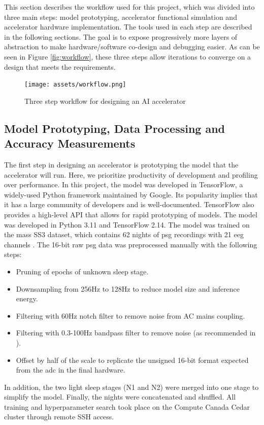 This section describes the workflow used for this project, which was divided into three main steps: model prototyping, accelerator functional simulation and accelerator hardware implementation.
The tools used in each step are described in the following sections. The goal is to expose progressively more layers of abstraction to make hardware/software co-design and debugging easier. As
can be seen in Figure \ref{fig:workflow}, these three steps allow iterations to converge on a design that meets the requirements.
\begin{figure}[H]
    \centering
    \caption{Three step workflow for designing an AI accelerator}
    \texttt{[image: assets/workflow.png]}
\end{figure}
\label{fig:workflow}

\subsection{Model Prototyping, Data Processing and Accuracy Measurements}
The first step in designing an accelerator is prototyping the model that the accelerator will run. Here, we prioritize productivity of development and profiling over performance. In this project,
the model was developed in TensorFlow, a widely-used Python framework maintained by Google. Its popularity implies that it has a large community of developers and is well-documented. TensorFlow
also provides a high-level API that allows for rapid prototyping of models.
The model was developed in Python 3.11 and TensorFlow 2.14. The model was trained on the \ac{mass} SS3 dataset, which contains 62 nights of \ac{psg} recordings with 21 \ac{eeg} channels \cite*{SP3/9MYUCS_2022}.
The 16-bit raw \ac{psg} data was preprocessed manually with the following steps:
\begin{itemize}
    \item Pruning of epochs of unknown sleep stage.
    \item Downsampling from 256Hz to 128Hz to reduce model size and inference energy.
    \item Filtering with 60Hz notch filter to remove noise from AC mains coupling.
    \item Filtering with 0.3-100Hz bandpass filter to remove noise (as recommended in \cite{supratak2017deepsleepnet}).
    \item Offset by half of the scale to replicate the unsigned 16-bit format expected from the \ac{adc} in the final hardware.
\end{itemize}
In addition, the two light sleep stages (N1 and N2) were merged into one stage to simplify the model. Finally, the nights were concatenated and shuffled.
All training and hyperparameter search took place on the Compute Canada Cedar cluster through remote SSH access.

